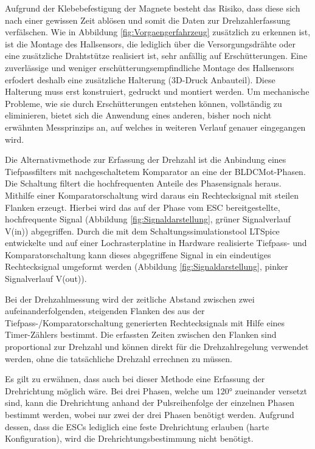 Aufgrund der Klebebefestigung der Magnete besteht das Risiko, dass diese sich nach einer gewissen Zeit ablösen und somit die Daten zur Drehzahlerfassung verfälschen. Wie in Abbildung \ref{fig:Vorgaengerfahrzeug} zusätzlich zu erkennen ist, ist die Montage des Hallsensors, die lediglich über die Versorgungsdrähte oder eine zusätzliche Drahtstütze realisiert ist, sehr anfällig auf Erschütterungen. Eine zuverlässige und weniger erschütterungsempfindliche Montage des Hallsensors erfodert deshalb eine zusätzliche Halterung (3D-Druck Anbauteil). Diese Halterung muss erst konstruiert, gedruckt und montiert werden. Um mechanische Probleme, wie sie durch Erschütterungen entstehen können, vollständig zu eliminieren, bietet sich die Anwendung eines anderen, bisher noch nicht erwähnten Messprinzips an, auf welches in weiteren Verlauf genauer eingegangen wird.\vspace{11pt}

Die Alternativmethode zur Erfassung der Drehzahl ist die Anbindung eines Tiefpassfilters mit nachgeschaltetem Komparator an eine der \ac{BLDCMot}-Phasen. Die Schaltung filtert die hochfrequenten Anteile des Phasensignals heraus. Mithilfe einer Komparatorschaltung wird daraus ein Rechtecksignal mit steilen Flanken erzeugt. Hierbei wird das auf der Phase vom \ac{ESC} bereitgestellte, hochfrequente Signal (Abbildung \ref{fig:Signaldarstellung}, grüner Signalverlauf V(in)) abgegriffen. Durch die mit dem Schaltungssimulationstool LTSpice entwickelte und auf einer Lochrasterplatine in Hardware realisierte Tiefpass- und Komparatorschaltung kann dieses abgegriffene Signal in ein eindeutiges Rechtecksignal umgeformt werden (Abbildung \ref{fig:Signaldarstellung}, pinker Signalverlauf V(out)).\vspace{11pt}

Bei der Drehzahlmessung wird der zeitliche Abstand zwischen zwei aufeinanderfolgenden, steigenden Flanken des aus der Tiefpass-/Komparatorschaltung generierten Rechtecksignals mit Hilfe eines Timer-Zählers bestimmt. Die erfassten Zeiten zwischen den Flanken sind proportional zur Drehzahl und können direkt für die Drehzahlregelung verwendet werden, ohne die tatsächliche Drehzahl errechnen zu müssen.\vspace{11pt}

Es gilt zu erwähnen, dass auch bei dieser Methode eine Erfassung der Drehrichtung möglich wäre. Bei drei Phasen, welche um 120° zueinander versetzt sind, kann die Drehrichtung anhand der Pulsreihenfolge der einzelnen Phasen bestimmt werden, wobei nur zwei der drei Phasen benötigt werden. Aufgrund dessen, dass die ESCs lediglich eine feste Drehrichtung erlauben (harte Konfiguration), wird die Drehrichtungsbestimmung nicht benötigt.

